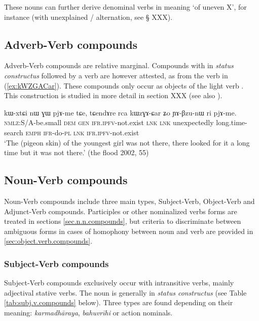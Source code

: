 These nouns can further derive denominal verbs in  meaning `of uneven X', for instance     (with unexplained  /  alternation, see § XXX).

\subsection{Adverb-Verb compounds} \label{sec.adv.v.compounds}
Adverb-Verb compounds are relative marginal. Compounds with  in \textit{status constructus}  followed by a verb are however attested, as  from the verb  in (\ref{ex:kWZGACar}). These compounds only occur as objects of the light verb . This construction is studied in more detail in section XXX (see also \citealt[252]{jacques16complementation}).

\begin{exe}
\ex \label{ex:kWZGACar}
\gll kɯ-xtɕi nɯ ɣɯ pjɤ-me tɕe, tɕendɤre rca kɯzɣɤ-ɕar ʑo ɲɤ-βzu-nɯ ri pjɤ-me.\\
\textsc{nmlz}:S/A-be.small \textsc{dem} \textsc{gen} \textsc{ifr}.\textsc{ipfv}-not.exist \textsc{lnk} \textsc{lnk} unexpectedly long.time-search \textsc{emph} \textsc{ifr}-do-\textsc{pl}  \textsc{lnk} \textsc{ifr}.\textsc{ipfv}-not.exist \\
\glt `The (pigeon skin) of the youngest girl was not there, there looked for it a long time but it was not there.' (the flood 2002, 55)
\end{exe}

\subsection{Noun-Verb compounds} \label{sec.n.v.compounds}
Noun-Verb compounds include three main types, Subject-Verb, Object-Verb and Adjunct-Verb compounds. Participles or other nominalized verbs forms are treated in sections \ref{sec.n.n.compounds}, but criteria to discriminate between ambiguous forms in cases of homophony between noun and verb are provided in \ref{sec:object.verb.compounds}.

\subsubsection{Subject-Verb compounds} \label{sec:subject.verb.compounds}
Subject-Verb compounds exclusively occur with intransitive verbs, mainly adjectival stative verbs. The noun is generally in \textit{status constructus} (see Table \ref{tab:subj.v.compounds} below). Three types are found depending on their meaning: \textit{karmadhāraya}, \textit{bahuvrīhi} or action nominals.

